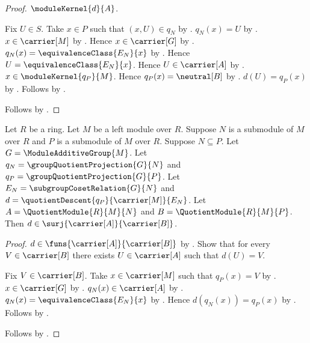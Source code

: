 \begin{proof}
        $\moduleKernel{d}{A}$.
    \begin{subproof}
        Fix $U\in S$.
        Take $x\in P$ such that $(x,U)\in q_N$ by .
        $q_N(x)=U$ by .
        $x\in\carrier[M]$ by .
        Hence $x\in\carrier[G]$ by
            .
        $q_N(x)=\equivalenceClass{E_N}{x}$ by
            .
        Hence $U=\equivalenceClass{E_N}{x}$.
        Hence $U\in\carrier[A]$ by
            .
        $x\in\moduleKernel{q_P}{M}$.
        Hence $q_P(x)=\neutral[B]$ by .
        $d(U)=q_P(x)$ by
            .
        Follows by .
    \end{subproof}
    Follows by .
\end{proof}

\begin{theorem}\label{module_quotient_comparison_surjective}
    Let $R$ be a ring.
    Let $M$ be a left module over $R$.
    Suppose $N$ is a submodule of $M$ over $R$ and
        $P$ is a submodule of $M$ over $R$.
    Suppose $N\subseteq P$.
    Let $G=\ModuleAdditiveGroup{M}$.
    Let $q_N=\groupQuotientProjection{G}{N}$ and
        $q_P=\groupQuotientProjection{G}{P}$.
    Let $E_N=\subgroupCosetRelation{G}{N}$ and
        $d=\quotientDescent{q_P}{\carrier[M]}{E_N}$.
    Let $A=\QuotientModule{R}{M}{N}$ and
        $B=\QuotientModule{R}{M}{P}$.
    Then $d\in\surj{\carrier[A]}{\carrier[B]}$.
\end{theorem}
\begin{proof}
    $d\in\funs{\carrier[A]}{\carrier[B]}$ by
        .
    Show that for every $V\in\carrier[B]$ there exists $U\in\carrier[A]$
        such that $d(U)=V$.
    \begin{subproof}
        Fix $V\in\carrier[B]$.
        Take $x\in\carrier[M]$ such that $q_P(x)=V$ by
            .
        $x\in\carrier[G]$ by
            .
        $q_N(x)\in\carrier[A]$ by
            .
        $q_N(x)=\equivalenceClass{E_N}{x}$ by
            .
        Hence $d(q_N(x))=q_P(x)$ by
            .
        Follows by \auto.
    \end{subproof}
    Follows by .
\end{proof}

